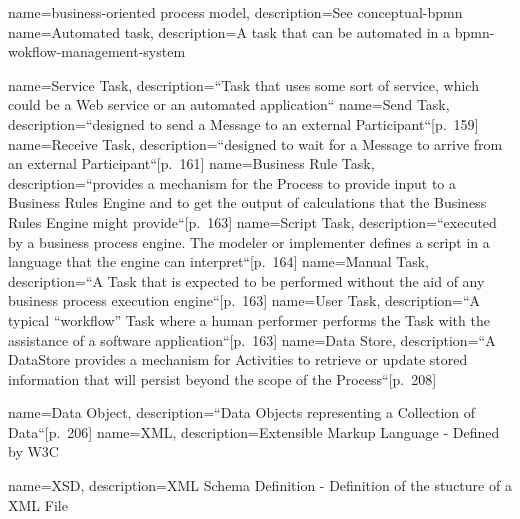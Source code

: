 {
	name={business-oriented process model},
	description={See \gls{conceptual-bpmn}}
}
{
	name={Automated task},
	description={A task that can be automated in a \gls{bpmn-wokflow-management-system}}
}

{
	name={Service Task},
	description={``Task that uses some sort of service, which could be a Web service or an automated application``\cite[p.~158]{bpmnstandard} }
}
{
	name={Send Task},
	description={``designed to send a Message to an external Participant``[p.~159]\cite{bpmnstandard} }
}
{
	name={Receive Task},
	description={``designed to wait for a Message to arrive from an external Participant``[p.~161]\cite{bpmnstandard} }
}
{
	name={Business Rule Task},
	description={``provides a mechanism for the Process to provide input to a Business Rules Engine and to get the output of calculations that the Business Rules Engine might provide``[p.~163]\cite{bpmnstandard} }
}
{
	name={Script Task},
	description={``executed by a business process engine. The modeler or implementer defines a script in a language that the engine can interpret``[p.~164]\cite{bpmnstandard} }
}
{
	name={Manual Task},
	description={``A Task that is expected to be performed without the aid of any business process execution engine``[p.~163]\cite{bpmnstandard} }
}
{
	name={User Task},
	description={``A typical “workflow” Task where a human performer performs the Task with the assistance of a software application``[p.~163]\cite{bpmnstandard} }
}
{
	name={Data Store},
	description={``A DataStore provides a mechanism for Activities to retrieve or update stored information that will persist beyond the
		scope of the Process``[p.~208]\cite{bpmnstandard} }
}

{
	name={Data Object},
	description={``Data Objects representing a Collection of Data``[p.~206]\cite{bpmnstandard} }
}
{
	name={XML},
	description={Extensible Markup Language - Defined by W3C\cite{bray1997extensibl} }
}

{
	name={XSD},
	description={XML Schema Definition - Definition of the stucture of a XML File\cite{bray1997extensibl} }
}